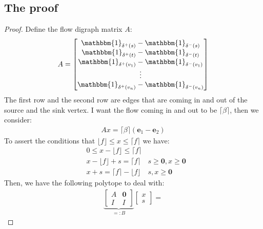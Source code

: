 \documentclass[]{article}
\theoremstyle{definition}
\begin{document}
    \subsection{The proof}
    \begin{proof}
        Define the flow digraph matrix $A$: 
        \begin{align}
            A = \begin{bmatrix}
                \mathbbm{1}_{\delta^+(s)} - \mathbbm{1}_{\delta^{-}{(s)}}
                \\
                \mathbbm{1}_{\delta^+(t)} - \mathbbm{1}_{\delta^{-}{(t)}}
                \\
                \mathbbm{1}_{\delta^+(v_1)} - \mathbbm{1}_{\delta^{-}(v_1)}
                \\
                \vdots
                \\
                \mathbbm{1}_{\delta^+(v_n)} - \mathbbm{1}_{\delta^{-}(v_n)}
            \end{bmatrix}
        \end{align}
        The first row and the second row are edges that are coming in and out of the source and the sink vertex. I want the flow coming in and out to be $\lceil \beta \rceil$, then we consider: 
        \begin{align}
            Ax = \lceil \beta\rceil(\mathbf e_1 -\mathbf e_2)
        \end{align} 
        To assert the conditions that $\lfloor f\rfloor\le x \le \lceil f\rceil$ we have: 
        \begin{align}
            & 0 \le x - \lfloor f \rfloor\le \lceil f\rceil
            \\
            & x - \lfloor f \rfloor + s = \lceil f \rceil \quad s \ge \mathbf 0, x\ge \mathbf 0
            \\
            & x + s = \lceil f \rceil - \lfloor f \rfloor \quad s, x\ge \mathbf 0
        \end{align}
        Then, we have the following polytope to deal with: 
        \begin{align}
            \underbrace{\begin{bmatrix}
                A & \mathbf 0
                \\
                I & I 
            \end{bmatrix}}_{=:B}\begin{bmatrix}
                x \\ s
            \end{bmatrix} = 

\end{align}
\end{proof}
\end{document}
